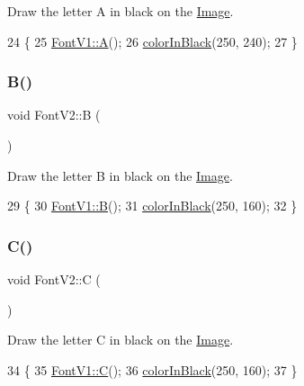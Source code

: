 Draw the letter A in black on the \mbox{\hyperlink{class_image}{Image}}. 


\begin{DoxyCode}
24                \{
25     \mbox{\hyperlink{class_font_v1_a29afd2079bc41cdec9d3de6bb4e1be52}{FontV1::A}}();
26     \mbox{\hyperlink{class_font_v2_a04f2501961bc286ce70fbb6a840b0e8a}{colorInBlack}}(250, 240);
27 \}
\end{DoxyCode}
\mbox{\label{class_font_v2_a0a895c96067874028864303ab64ce889}} 
\subsubsection{\texorpdfstring{B()}{B()}}
{\footnotesize\ttfamily void Font\+V2\+::B (\begin{DoxyParamCaption}{ }\end{DoxyParamCaption})}



Draw the letter B in black on the \mbox{\hyperlink{class_image}{Image}}. 


\begin{DoxyCode}
29                \{
30     \mbox{\hyperlink{class_font_v1_a620ee7876d479807f73481f27be48f2a}{FontV1::B}}();
31     \mbox{\hyperlink{class_font_v2_a04f2501961bc286ce70fbb6a840b0e8a}{colorInBlack}}(250, 160);
32 \}
\end{DoxyCode}
\mbox{\label{class_font_v2_ab7dc3a07d1442bd391513c4c202f2a43}} 
\subsubsection{\texorpdfstring{C()}{C()}}
{\footnotesize\ttfamily void Font\+V2\+::C (\begin{DoxyParamCaption}{ }\end{DoxyParamCaption})}



Draw the letter C in black on the \mbox{\hyperlink{class_image}{Image}}. 


\begin{DoxyCode}
34                \{
35     \mbox{\hyperlink{class_font_v1_a80602716ae6907fa518fbb50eeda2515}{FontV1::C}}();
36     \mbox{\hyperlink{class_font_v2_a04f2501961bc286ce70fbb6a840b0e8a}{colorInBlack}}(250, 160);
37 \}
\end{DoxyCode}
\mbox{\label{class_font_v2_a04f2501961bc286ce70fbb6a840b0e8a}} 
